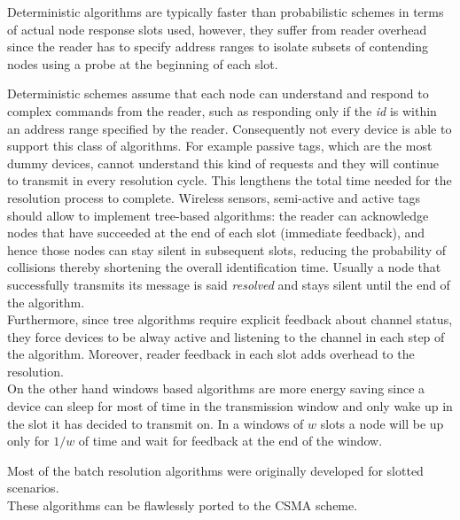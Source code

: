 \documentclass[12pt,a4paper]{report}
\newcommand{\rev}[1]{\textcolor{Cerulean}{#1}}
\begin{document}
Deterministic algorithms are typically faster than probabilistic schemes in terms of actual node response slots used, however, they suffer from reader overhead since the reader has to specify address ranges to isolate  subsets of contending nodes using a probe at the beginning of each slot.

Deterministic schemes assume that each node can understand and respond to complex commands from the reader, such as responding only if the \emph{id} is within an address range specified by the reader. Consequently not every device is able to support this class of algorithms. For example passive tags, which are the most dummy devices, cannot understand this kind of requests and they will continue to transmit in every resolution cycle. This lengthens the total time needed for the resolution process to complete. Wireless sensors, semi-active and active tags should allow to implement tree-based algorithms: the reader can acknowledge nodes that have succeeded at the end of each slot (immediate feedback), and hence those nodes can stay silent in subsequent slots, reducing the probability of collisions thereby shortening the overall identification time. Usually a node that successfully transmits its message is said \emph{resolved} and stays silent until the end of the algorithm.\\
Furthermore, since tree algorithms require explicit feedback about channel status, they force devices to be alway active and listening to the channel in each step of the algorithm. 
\rev{Moreover, reader feedback in each slot adds overhead to the resolution.}\\
On the other hand windows based algorithms are more energy saving since a device can sleep for most of time in the transmission window and only wake up in the slot it has decided to transmit on. In a windows of $w$ slots  a node will be up only for $1/w$ of time and wait for feedback at the end of the window.


Most of the batch resolution algorithms  were originally developed for slotted scenarios.\\
These algorithms can be flawlessly ported to the CSMA scheme.
 
\end{document}

